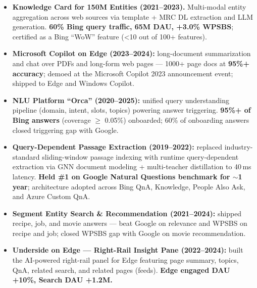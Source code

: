 \documentclass[10.5pt,letterpaper]{article}
\begin{document}
\begin{itemize}
  \item \textbf{Knowledge Card for 150M Entities (2021--2023).} Multi-modal entity aggregation across web sources via template + MRC DL extraction and LLM generation. \textbf{60\% Bing query traffic, 65M DAU, +3.0\% WPSBS}; certified as a Bing ``WoW'' feature (<10 out of 100+ features).
  \item \textbf{Microsoft Copilot on Edge (2023--2024):} long-document summarization and chat over PDFs and long-form web pages --- 1000+ page docs at \textbf{95\%+ accuracy}; demoed at the Microsoft Copilot 2023 announcement event; shipped to Edge and Windows Copilot.
  \item \textbf{NLU Platform ``Orca'' (2020--2025):} unified query understanding pipeline (domain, intent, slots, topics) powering answer triggering. \textbf{95\%+ of Bing answers} (coverage $\ge$ 0.05\%) onboarded; 60\% of onboarding answers closed triggering gap with Google.
  \item \textbf{Query-Dependent Passage Extraction (2019--2022):} replaced industry-standard sliding-window passage indexing with runtime query-dependent extraction via GNN document modeling + multi-teacher distillation to 40\,ms latency. \textbf{Held \#1 on Google Natural Questions benchmark for $\sim$1 year}; architecture adopted across Bing QnA, Knowledge, People Also Ask, and Azure Custom QnA.
  \item \textbf{Segment Entity Search \& Recommendation (2021--2024):} shipped recipe, job, and movie answers --- beat Google on relevance and WPSBS on recipe and job; closed WPSBS gap with Google on movie recommendation.
  \item \textbf{Underside on Edge --- Right-Rail Insight Pane (2022--2024):} built the AI-powered right-rail panel for Edge featuring page summary, topics, QnA, related search, and related pages (feeds). \textbf{Edge engaged DAU +10\%, Search DAU +1.2M.}
\end{itemize}

\end{document}
